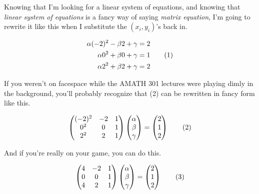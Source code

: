 \documentclass{article}
\newcommand\numberthis{\addtocounter{equation}{1}\tag{\theequation}}
\def\a{\alpha}
\def\b{\beta}
\def\c{\gamma}
\begin{document}
Knowing that I'm looking for a linear system of equations, and knowing that \textit{linear system of equations} is a fancy way of saying \textit{matrix equation}, I'm going to rewrite it like this when I substitute the $(x_i, y_i)$'s back in. 

\begin{align*}
 \a (-2)^2 - \b 2 + \c &= 2 \\
 \a 0^2 + \b 0 + \c &= 1 \numberthis \\
 \a 2^2 + \b 2 + \c &= 2 \\
\end{align*}

If you weren't on facespace while the AMATH 301 lectures were playing dimly in the background, you'll probably recognize that (2) can be rewritten in fancy form like this.

\[
\begin{pmatrix} (-2)^2 & -2 & 1 \\ 0^2 & 0 & 1 \\ 2^2 & 2 & 1\\ \end{pmatrix}
\begin{pmatrix} \a \\ \b \\ \c \\ \end{pmatrix} = 
\begin{pmatrix} 2 \\ 1 \\ 2 \\ \end{pmatrix} \numberthis
\] 

And if you're really on your game, you can do this.

\[
\begin{pmatrix} 4 & -2 & 1 \\ 0 & 0 & 1 \\ 4 & 2 & 1\\ \end{pmatrix}
\begin{pmatrix} \a \\ \b \\ \c \\ \end{pmatrix} = 
\begin{pmatrix} 2 \\ 1 \\ 2 \\ \end{pmatrix} \numberthis
\] 
\end{document}
